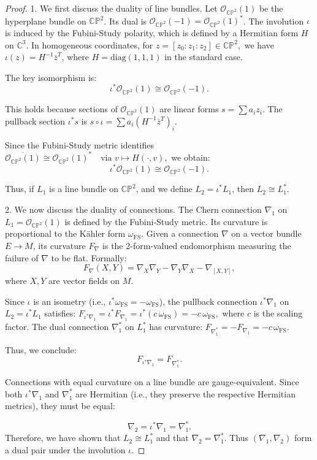 \documentclass[runningheads]{llncs}
\begin{document}
\begin{proof}
1. We first discuss the duality of line bundles.
\smallskip 
Let $\mathcal{O}_{\mathbb{CP}^2}(1)$ be the hyperplane bundle on $\mathbb{CP}^2$. Its dual is  $\mathcal{O}_{\mathbb{CP}^2}(-1)= \mathcal{O}_{\mathbb{CP}^2}(1)^*$. The involution $\iota$ is induced by  the Fubini-Study polarity, which is defined by a Hermitian form $H$ on $\mathbb{C}^3$. In homogeneous coordinates, for 
$z = [z_0 : z_1 : z_2] \in \mathbb{CP}^2,$
we have
$\iota(z) = H^{-1} \overline{z}^T$, where  $H = \mathrm{diag}(1, 1, 1)$ in the standard case.


The key isomorphism is:
\[
\iota^* \mathcal{O}_{\mathbb{CP}^2}(1) \cong \mathcal{O}_{\mathbb{CP}^2}(-1).
\]

This holds because sections of $\mathcal{O}_{\mathbb{CP}^2}(1)$ are linear forms $s = \sum a_i z_i.$ The pullback section $\iota^*s$ is $s \circ \iota = \sum a_i (H^{-1} \overline{z}^T)_i$. 

Since the Fubini-Study metric identifies 
$\overline{\mathcal{O}_{\mathbb{CP}^2}(1)} \cong \mathcal{O}_{\mathbb{CP}^2}(1)^* \quad \text{via } v \mapsto H(\cdot, v),$
we obtain:
\[
\iota^* \mathcal{O}_{\mathbb{CP}^2}(1) \cong \mathcal{O}_{\mathbb{CP}^2}(-1).
\]

Thus, if $L_1$ is a line bundle on $\mathbb{CP}^2$, and we define $L_2 = \iota^* L_1$, then $L_2 \cong L_1^*.$


\medskip 

2. We now discuss the duality of connections. The Chern connection $\nabla_1$ on $L_1 = \mathcal{O}_{\mathbb{CP}^2}(1)$
is defined by the Fubini-Study metric. Its curvature is proportional to the Kähler form $\omega_{\mathrm{FS}}$. Given a connection $\nabla$ on a vector bundle $E\to M$, its curvature $F_{\nabla}$ is the 2-form-valued endomorphism measuring the failure of $\nabla$ to be flat. Formally:
\[F_{\nabla}(X,Y)=\nabla_X\nabla_Y-\nabla_Y\nabla_X-\nabla_{[X,Y]},\] where $X,Y$ are vector fields on $M$. 

Since $\iota$ is an isometry (i.e., $\iota^* \omega_{\mathrm{FS}} = -\omega_{\mathrm{FS}}$), the pullback connection $\iota^* \nabla_1$ on 
$L_2 = \iota^* L_1$
satisfies:
$F_{\iota^* \nabla_1} = \iota^* F_{\nabla_1} = \iota^*(c \, \omega_{\mathrm{FS}}) = -c \, \omega_{\mathrm{FS}},$
where $c$ is the scaling factor. 
The dual connection $\nabla_1^*$ on $L_1^*$ has curvature:
$F_{\nabla_1^*} = -F_{\nabla_1} = -c \, \omega_{\mathrm{FS}}.$

Thus, we conclude:
\[
F_{\iota^* \nabla_1} = F_{\nabla_1^*}.
\]

Connections with equal curvature on a line bundle are gauge-equivalent. Since both $\iota^* \nabla_1$ and $\nabla_1^*$ are Hermitian (i.e., they preserve the respective Hermitian metrics), they must be equal:

\[
\nabla_2 = \iota^* \nabla_1 = \nabla_1^*.
\]
Therefore, we have shown that $L_2 \cong L_1^*$ and that $\nabla_2=\nabla_1^*$. Thus $(\nabla_1,\nabla_2)$ form a dual pair under the involution $\iota$.
\end{proof}
\end{document}
